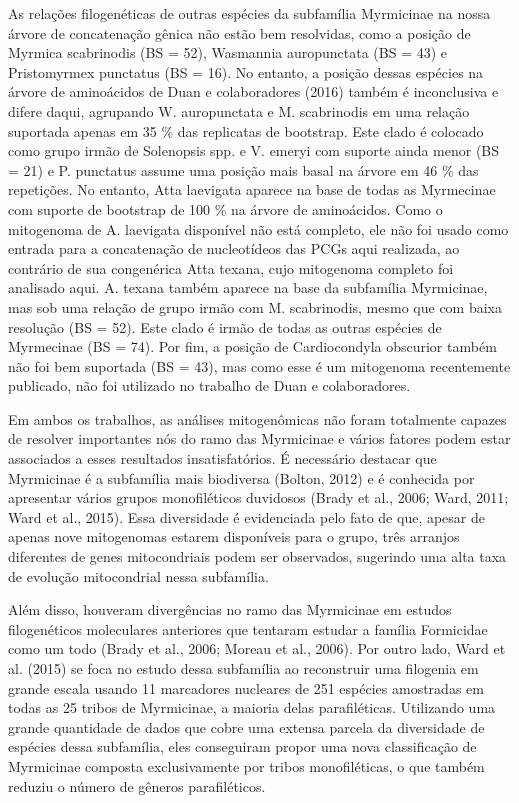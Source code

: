 \documentclass[../DISSERTACAO_MAIN.tex]{subfiles}
\begin{document}
	As relações filogenéticas de outras espécies da subfamília Myrmicinae na nossa árvore de concatenação gênica não estão bem resolvidas, como a posição de Myrmica scabrinodis (BS = 52), Wasmannia auropunctata (BS = 43) e Pristomyrmex punctatus (BS = 16). No entanto, a posição dessas espécies na árvore de aminoácidos de Duan e colaboradores (2016) também é inconclusiva e difere daqui, agrupando W. auropunctata e M. scabrinodis em uma relação suportada apenas em 35 \% das replicatas de bootstrap. Este clado é colocado como grupo irmão de Solenopsis spp. e V. emeryi com suporte ainda menor (BS = 21) e P. punctatus assume uma posição mais basal na árvore em 46 \% das repetições. No entanto, Atta laevigata aparece na base de todas as Myrmecinae com suporte de bootstrap de 100 \% na árvore de aminoácidos. Como o mitogenoma de A. laevigata disponível não está completo, ele não foi usado como entrada para a concatenação de nucleotídeos das PCGs aqui realizada, ao contrário de sua congenérica Atta texana, cujo mitogenoma completo foi analisado aqui. A. texana também aparece na base da subfamília Myrmicinae, mas sob uma relação de grupo irmão com M. scabrinodis, mesmo que com baixa resolução (BS = 52). Este clado é irmão de todas as outras espécies de Myrmecinae (BS = 74). Por fim, a posição de Cardiocondyla obscurior também não foi bem suportada (BS = 43), mas como esse é um mitogenoma recentemente publicado, não foi utilizado no trabalho de Duan e colaboradores.
	
	Em ambos os trabalhos, as análises mitogenômicas não foram totalmente capazes de resolver importantes nós do ramo das Myrmicinae e vários fatores podem estar associados a esses resultados insatisfatórios. É necessário destacar que Myrmicinae é a subfamília mais biodiversa (Bolton, 2012) e é conhecida por apresentar vários grupos monofiléticos duvidosos (Brady et al., 2006; Ward, 2011; Ward et al., 2015). Essa diversidade é evidenciada pelo fato de que, apesar de apenas nove mitogenomas estarem disponíveis para o grupo, três arranjos diferentes de genes mitocondriais podem ser observados, sugerindo uma alta taxa de evolução mitocondrial nessa subfamília.
	
	Além disso, houveram divergências no ramo das Myrmicinae em estudos filogenéticos moleculares anteriores que tentaram estudar a família Formicidae como um todo (Brady et al., 2006; Moreau et al., 2006). Por outro lado, Ward et al. (2015) se foca no estudo dessa subfamília ao reconstruir uma filogenia em grande escala usando 11 marcadores nucleares de 251 espécies amostradas em todas as 25 tribos de Myrmicinae, a maioria delas parafiléticas. Utilizando uma grande quantidade de dados que cobre uma extensa parcela da diversidade de espécies dessa subfamília, eles conseguiram propor uma nova classificação de Myrmicinae composta exclusivamente por tribos monofiléticas, o que também reduziu o número de gêneros parafiléticos.
	
\end{document}
